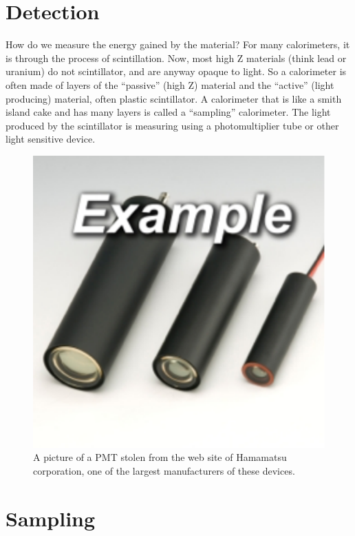 \;

\section{Detection}

\noindent
How do we measure the energy gained by the material? For many calorimeters, it is through the process of scintillation. Now, most high Z materials (think lead or uranium) do not scintillator, and are anyway opaque to light. So a calorimeter is often made of layers of the ``passive'' (high Z) material and the ``active'' (light producing) material, often plastic scintillator. A calorimeter that is like a smith island cake and has many layers is called a ``sampling'' calorimeter. The light produced by the scintillator is measuring using a photomultiplier tube or other light sensitive device.


\;
\;

\begin{figure}[h]
\centering\includegraphics[scale=0.5]{./calorimetry/Pictures/fig5.pdf}
\caption{A picture of a PMT stolen from the web site of Hamamatsu corporation, one of the largest manufacturers of these devices.}
\label{fig:pdgdedx}
\end{figure}

\;

\section{Sampling}

